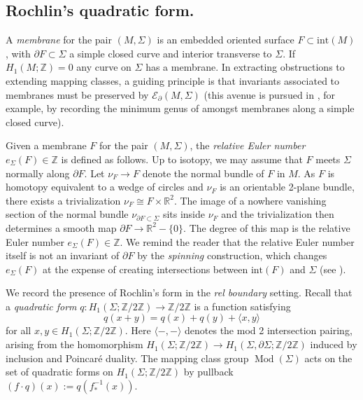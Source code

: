 \documentclass[10pt]{amsart}
\numberwithin{equation}{section}
\theoremstyle{plain}
\theoremstyle{definition}
\theoremstyle{remark}
\DeclareMathOperator{\Mod}{Mod}
\begin{document}
\subsection{Rochlin's quadratic form.} A \textit{membrane} for the pair $(M,\Sigma)$ is an embedded oriented surface $F \subset \textrm{int}(M)$, with $\partial F \subset \Sigma$ a simple closed curve and interior transverse to $\Sigma$. If $H_1(M;\mathbb{Z}) = 0$ any curve on $\Sigma$ has a membrane. In extracting obstructions to extending mapping classes, a guiding principle is that invariants associated to membranes must be preserved by $\mathcal{E}_{\partial}(M,\Sigma)$ (this avenue is pursued in \cite{SlopeGenera}, for example, by recording the minimum genus of amongst membranes along a simple closed curve). 

Given a membrane $F$ for the pair $(M,\Sigma)$, the \textit{relative Euler number} $e_{\Sigma}(F) \in \mathbb{Z}$ is defined as follows. Up to isotopy, we may assume that $F$ meets $\Sigma$ normally along $\partial F$. Let $\nu_F \to F$ denote the normal bundle of $F$ in $M$. As $F$ is homotopy equivalent to a wedge of circles and $\nu_F$ is an orientable 2-plane bundle, there exists a trivialization $\nu_F \cong F \times \mathbb{R}^2$. The image of a nowhere vanishing section of the normal bundle $\nu_{\partial F \subset \Sigma} $ sits inside $\nu_F$ and the trivialization then determines a smooth map $\partial F \to \mathbb{R}^2 - \{0\}$. The degree of this map is the relative Euler number $e_{\Sigma}(F) \in \mathbb{Z}$. We remind the reader that the relative Euler number itself is not an invariant of $\partial F$ by the \textit{spinning} construction, which changes $e_{\Sigma}(F)$ at the expense of creating intersections between $\textrm{int}(F)$ and $\Sigma$ (see \cite{FreedmanKirby}). 

We record the presence of Rochlin's form in the \textit{rel boundary} setting.  Recall that a \textit{quadratic form} $q : H_1(\Sigma;\mathbb{Z}/2\mathbb{Z}) \to \mathbb{Z}/2\mathbb{Z}$ is a function satisfying 
\[ 	q(x+y) = q(x)+q(y) + \langle x,y\rangle \]
for all $x,y \in H_1(\Sigma;\mathbb{Z}/2\mathbb{Z})$. Here $\langle -,-\rangle$ denotes the mod 2 intersection pairing, arising from the homomorphism $H_1(\Sigma;\mathbb{Z}/2\mathbb{Z}) \to H_1(\Sigma,\partial \Sigma;\mathbb{Z}/2\mathbb{Z})$ induced by inclusion and Poincar\'{e} duality.
The mapping class group $\Mod(\Sigma)$ acts on the set of quadratic forms on $H_1(\Sigma;\mathbb{Z}/2\mathbb{Z})$ by pullback $(f\cdot q)(x) := q(f^{-1}_*(x))$.
\end{document}
